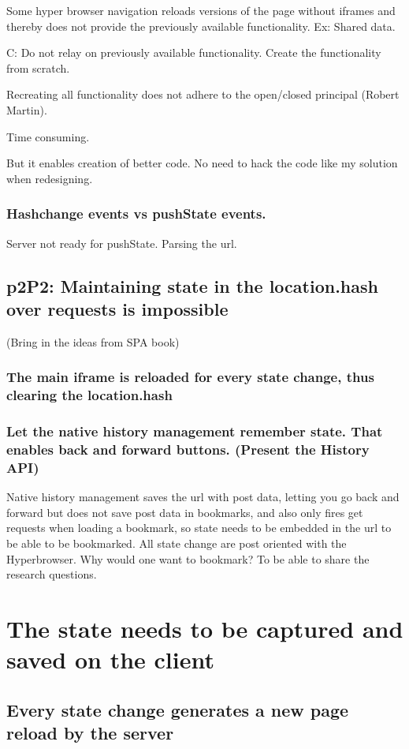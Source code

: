 \documentclass[english]{ifimaster}
\begin{document}
Some hyper browser navigation reloads versions of the page without iframes and thereby does not provide the previously available functionality. Ex: Shared data.

C: Do not relay on previously available functionality. Create the functionality from scratch.

Recreating all functionality does not adhere to the open/closed principal (Robert Martin).

Time consuming.

But it enables creation of better code. No need to hack the code like my solution when redesigning.
\subsubsection{Hashchange events vs pushState events.}
 Server not ready for pushState. Parsing the url. 
\subsection{p2P2: Maintaining state in the location.hash over requests is impossible}
(Bring in the ideas from SPA book)
\subsubsection{The main iframe is reloaded for every state change, thus clearing the location.hash}
\subsubsection{Let the native history management remember state. That enables back and forward buttons. (Present the History API)}

Native history management saves the url with post data, letting you go back and forward but does not save post data in bookmarks, and also only fires get requests when loading a bookmark, so state needs to be embedded in the url to be able to be bookmarked. All state change are post oriented with the Hyperbrowser.  Why would one want to bookmark? To be able to share the research questions.

\section{The state needs to be captured and saved on the client}
\subsection{Every state change generates a new page reload by the server}
\end{document}
